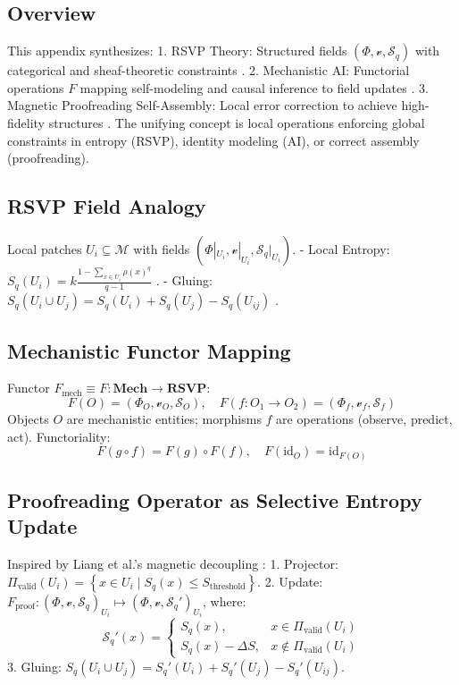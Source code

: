 \documentclass{article}
\theoremstyle{plain}
\theoremstyle{definition}
\begin{document}
\subsection{Overview}
This appendix synthesizes:
1. RSVP Theory: Structured fields $(\Phi, \mathcal{v}, \mathcal{S}_q)$ with categorical and sheaf-theoretic constraints \cite{Soares2024}.
2. Mechanistic AI: Functorial operations $F$ mapping self-modeling and causal inference to field updates \cite{Bennett2025}.
3. Magnetic Proofreading Self-Assembly: Local error correction to achieve high-fidelity structures \cite{Liang2025}.
The unifying concept is local operations enforcing global constraints in entropy (RSVP), identity modeling (AI), or correct assembly (proofreading).

\subsection{RSVP Field Analogy}
Local patches $U_i \subseteq \mathcal{M}$ with fields $(\Phi|_{U_i}, \mathcal{v}|_{U_i}, \mathcal{S}_q|_{U_i})$.
- Local Entropy: $S_q(U_i) = k \frac{1 - \sum_{x \in U_i} \rho(x)^q}{q-1}$ \cite{Tsallis1988}.
- Gluing: $S_q(U_i \cup U_j) = S_q(U_i) + S_q(U_j) - S_q(U_{ij})$ \cite{MacLane1992}.

\subsection{Mechanistic Functor Mapping}
Functor $F_\text{mech} \equiv F: \mathbf{Mech} \to \mathbf{RSVP}$:
\[
F(O) = (\Phi_O, \mathcal{v}_O, \mathcal{S}_O), \quad F(f: O_1 \to O_2) = (\Phi_f, \mathcal{v}_f, \mathcal{S}_f)
\]
Objects $O$ are mechanistic entities; morphisms $f$ are operations (observe, predict, act). Functoriality:
\[
F(g \circ f) = F(g) \circ F(f), \quad F(\text{id}_O) = \text{id}_{F(O)}
\]

\subsection{Proofreading Operator as Selective Entropy Update}
Inspired by Liang et al.’s magnetic decoupling \cite{Liang2025}:
1. Projector: $\Pi_\text{valid}(U_i) = \left\{ x \in U_i \mid S_q(x) \le S_\text{threshold} \right\}$.
2. Update: $F_\text{proof} : (\Phi, \mathcal{v}, \mathcal{S}_q)_{U_i} \mapsto (\Phi, \mathcal{v}, \mathcal{S}_q')_{U_i}$, where:
\[
\mathcal{S}_q'(x) = \begin{cases} S_q(x), & x \in \Pi_\text{valid}(U_i) \\ S_q(x) - \Delta S, & x \notin \Pi_\text{valid}(U_i) \end{cases}
\]
3. Gluing: $S_q(U_i \cup U_j) = S_q'(U_i) + S_q'(U_j) - S_q'(U_{ij})$.
\end{document}
